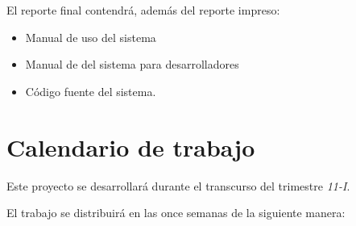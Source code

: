 \documentclass[11pt,letterpaper,titlepage]{article}
\newcommand{\grad}{\hspace{-2mm}$\phantom{a}^{\circ}$}
\begin{document}
 El reporte final contendr\'a, adem\'as del reporte impreso:
\begin{itemize}
 \item Manual de uso del sistema
 \item Manual de del sistema para desarrolladores
\item C\'odigo fuente del sistema.
 
\end{itemize}





% 
% 



 

\section{Calendario de trabajo}
Este proyecto se desarrollar\'a durante el transcurso del trimestre \textit{11-I}.

El trabajo se distribuir\'a en las once semanas de la siguiente manera:

\end{document}
